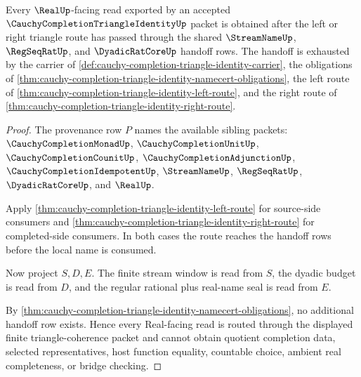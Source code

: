 \begin{theorem}
\label{thm:cauchy-completion-triangle-identity-real-handoff}
Every $\RealUp$-facing read exported by an accepted $\CauchyCompletionTriangleIdentityUp$ packet is obtained after the left or right triangle route has passed through the shared $\StreamNameUp$, $\RegSeqRatUp$, and $\DyadicRatCoreUp$ handoff rows. The handoff is exhausted by the carrier of \autoref{def:cauchy-completion-triangle-identity-carrier}, the obligations of \autoref{thm:cauchy-completion-triangle-identity-namecert-obligations}, the left route of \autoref{thm:cauchy-completion-triangle-identity-left-route}, and the right route of \autoref{thm:cauchy-completion-triangle-identity-right-route}.
\end{theorem}
\begin{proof}
The provenance row $P$ names the available sibling packets: $\CauchyCompletionMonadUp$, $\CauchyCompletionUnitUp$, $\CauchyCompletionCounitUp$, $\CauchyCompletionAdjunctionUp$, $\CauchyCompletionIdempotentUp$, $\StreamNameUp$, $\RegSeqRatUp$, $\DyadicRatCoreUp$, and $\RealUp$.

Apply \autoref{thm:cauchy-completion-triangle-identity-left-route} for source-side consumers and \autoref{thm:cauchy-completion-triangle-identity-right-route} for completed-side consumers. In both cases the route reaches the handoff rows before the local name is consumed.

Now project $S,D,E$. The finite stream window is read from $S$, the dyadic budget is read from $D$, and the regular rational plus real-name seal is read from $E$.

By \autoref{thm:cauchy-completion-triangle-identity-namecert-obligations}, no additional handoff row exists. Hence every Real-facing read is routed through the displayed finite triangle-coherence packet and cannot obtain quotient completion data, selected representatives, host function equality, countable choice, ambient real completeness, or bridge checking.
\end{proof}


